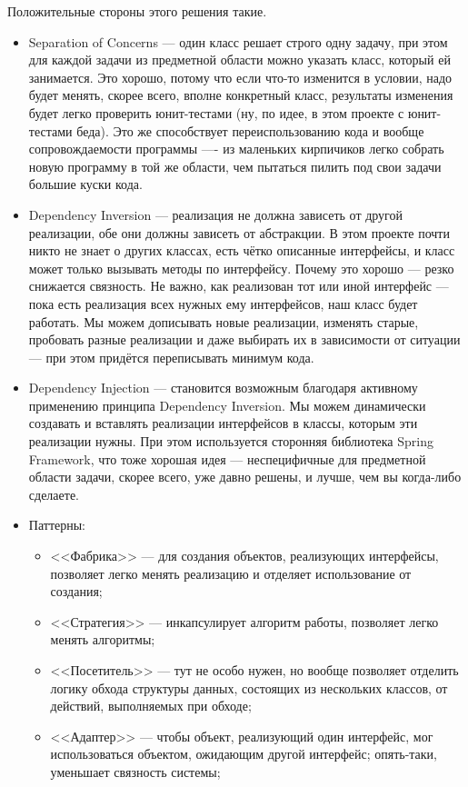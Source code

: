 \documentclass[a5paper]{article}
\begin{document}
Положительные стороны этого решения такие.
\begin{itemize}
    \item Separation of Concerns --- один класс решает строго одну задачу, при этом для каждой задачи из предметной области можно указать класс, который ей занимается. Это хорошо, потому что если что-то изменится в условии, надо будет менять, скорее всего, вполне конкретный класс, результаты изменения будет легко проверить юнит-тестами (ну, по идее, в этом проекте с юнит-тестами беда). Это же способствует переиспользованию кода и вообще сопровождаемости программы ---- из маленьких кирпичиков легко собрать новую программу в той же области, чем пытаться пилить под свои задачи большие куски кода.
    \item Dependency Inversion --- реализация не должна зависеть от другой реализации, обе они должны зависеть от абстракции. В этом проекте почти никто не знает о других классах, есть чётко описанные интерфейсы, и класс может только вызывать методы по интерфейсу. Почему это хорошо --- резко снижается связность. Не важно, как реализован тот или иной интерфейс --- пока есть реализация всех нужных ему интерфейсов, наш класс будет работать. Мы можем дописывать новые реализации, изменять старые, пробовать разные реализации и даже выбирать их в зависимости от ситуации --- при этом придётся переписывать минимум кода.
    \item Dependency Injection --- становится возможным благодаря активному применению принципа Dependency Inversion. Мы можем динамически создавать и вставлять реализации интерфейсов в классы, которым эти реализации нужны. При этом используется сторонняя библиотека Spring Framework, что тоже хорошая идея --- неспецифичные для предметной области задачи, скорее всего, уже давно решены, и лучше, чем вы когда-либо сделаете.
    \item Паттерны:
    \begin{itemize}
        \item <<Фабрика>> --- для создания объектов, реализующих интерфейсы, позволяет легко менять реализацию и отделяет использование от создания;
        \item <<Стратегия>> --- инкапсулирует алгоритм работы, позволяет легко менять алгоритмы;
        \item <<Посетитель>> --- тут не особо нужен, но вообще позволяет отделить логику обхода структуры данных, состоящих из нескольких классов, от действий, выполняемых при обходе; 
        \item <<Адаптер>> --- чтобы объект, реализующий один интерфейс, мог использоваться объектом, ожидающим другой интерфейс; опять-таки, уменьшает связность системы;

\end{itemize}
\end{itemize}
\end{document}
